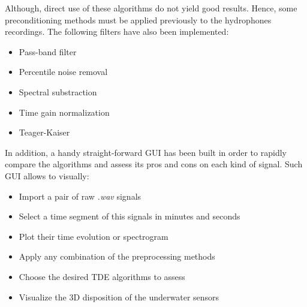   Although, direct use of these algorithms do not yield good results. Hence, some preconditioning methods must be applied previously to the hydrophones recordings. The following filters have also been implemented:
  \begin{itemize}
    \item Pass-band filter
    \item Percentile noise removal
    \item Spectral substraction
    \item Time gain normalization
    \item Teager-Kaiser
  \end{itemize}
  \vspace{5pt}
  
  In addition, a handy straight-forward GUI has been built in order to rapidly compare the algorithms and assess its pros and cons on each kind of signal. Such GUI allows to visually:
  \begin{itemize}
    \item Import a pair of raw \textit{.wav} signals
    \item Select a time segment of this signals in minutes and seconds
    \item Plot their time evolution or spectrogram
    \item Apply any combination of the preprocessing methods
    \item Choose the desired TDE algorithms to assess
    \item Visualize the 3D disposition of the underwater sensors
  \end{itemize}
  \vspace{5pt}
